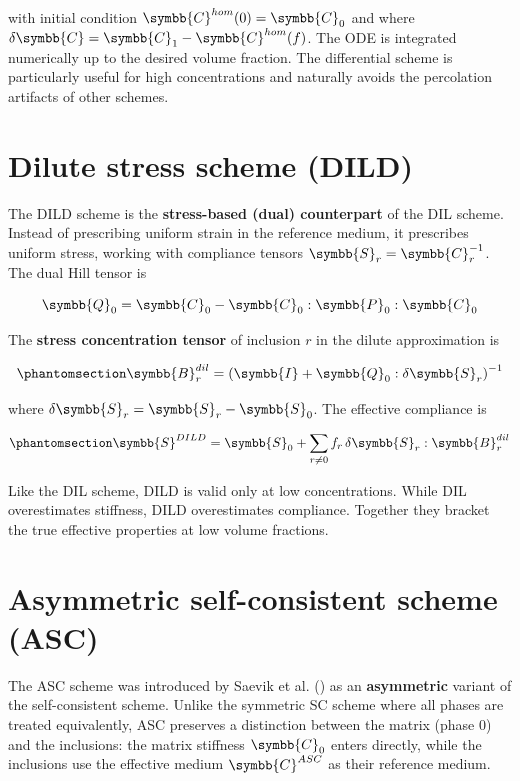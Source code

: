 \documentclass[
  a4paper,
  numbers=noendperiod,
  DIV=12]{scrreprt}
\newcommand{\uuuu}[1]{{\symbb{{#1}}}}
\begin{document}
with initial condition \(\uuuu{C}^{hom}(0) = \uuuu{C}_0\) and where
\(\delta\uuuu{C} = \uuuu{C}_1 - \uuuu{C}^{hom}(f)\). The ODE is
integrated numerically up to the desired volume fraction. The
differential scheme is particularly useful for high concentrations and
naturally avoids the percolation artifacts of other schemes.

\section{Dilute stress scheme (DILD)}\label{sec-dild-deriv}

The DILD scheme is the \textbf{stress-based (dual) counterpart} of the
DIL scheme. Instead of prescribing uniform strain in the reference
medium, it prescribes uniform stress, working with compliance tensors
\(\uuuu{S}_r = \uuuu{C}_r^{-1}\). The dual Hill tensor is

\[
\uuuu{Q}_0 = \uuuu{C}_0 - \uuuu{C}_0 : \uuuu{P}_0 : \uuuu{C}_0
\]

The \textbf{stress concentration tensor} of inclusion \(r\) in the
dilute approximation is

\begin{equation}\protect\phantomsection\label{eq-B-dild}{
\uuuu{B}_r^{dil} = \left(\uuuu{I} + \uuuu{Q}_0 : \delta\uuuu{S}_r\right)^{-1}
}\end{equation}

where \(\delta\uuuu{S}_r = \uuuu{S}_r - \uuuu{S}_0\). The effective
compliance is

\begin{equation}\protect\phantomsection\label{eq-S-dild}{
\uuuu{S}^{DILD} = \uuuu{S}_0 + \sum_{r \neq 0} f_r \, \delta\uuuu{S}_r : \uuuu{B}_r^{dil}
}\end{equation}

Like the DIL scheme, DILD is valid only at low concentrations. While DIL
overestimates stiffness, DILD overestimates compliance. Together they
bracket the true effective properties at low volume fractions.

\section{Asymmetric self-consistent scheme (ASC)}\label{sec-asc-deriv}

The ASC scheme was introduced by Saevik et al.
() as an \textbf{asymmetric} variant of
the self-consistent scheme. Unlike the symmetric SC scheme where all
phases are treated equivalently, ASC preserves a distinction between the
matrix (phase 0) and the inclusions: the matrix stiffness \(\uuuu{C}_0\)
enters directly, while the inclusions use the effective medium
\(\uuuu{C}^{ASC}\) as their reference medium.
\end{document}
